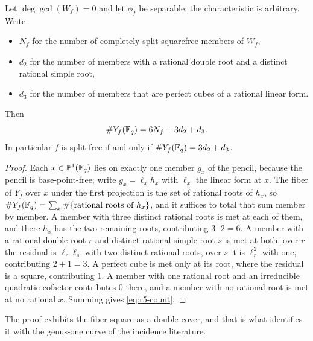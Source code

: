 \begin{proposition}\label{prop:r5-count}%
%
%
Let $\deg\gcd(W_f)=0$ and let $\phi_f$ be separable; the characteristic
is arbitrary.
Write
\begin{itemize}
\item $N_f$ for the number of completely split squarefree members of
      $W_f$,
\item $d_2$ for the number of members with a rational double root and a
      distinct rational simple root,
\item $d_3$ for the number of members that are perfect cubes of a
      rational linear form.
\end{itemize}
Then
\begin{equation}\label{eq:r5-count}
       \#Y_f(\mathbb F_q)=6N_f+3d_2+d_3 .
\end{equation}
In particular $f$ is split-free if and only if
$\#Y_f(\mathbb F_q)=3d_2+d_3$.
\end{proposition}

\begin{proof}
Each $x\in\mathbb P^1(\mathbb F_q)$ lies on exactly one member $g_x$ of the pencil,
because the pencil is base-point-free; write $g_x=\ell_xh_x$ with
$\ell_x$ the linear form at $x$.  The fiber of $Y_f$ over $x$ under the
first projection is the set of rational roots of $h_x$, so
$\#Y_f(\mathbb F_q)=\sum_x\#\{\text{rational roots of }h_x\}$, and it suffices
to total that sum member by member.  A member with three distinct
rational roots is met at each of them, and there $h_x$ has the two
remaining roots, contributing $3\cdot2=6$.  A member with a rational
double root $r$ and distinct rational simple root $s$ is met at both:
over $r$ the residual is $\ell_r\ell_s$ with two distinct rational
roots, over $s$ it is $\ell_r^2$ with one, contributing $2+1=3$.  A
perfect cube is met only at its root, where the residual is a square,
contributing $1$.  A member with one rational root and an irreducible
quadratic cofactor contributes $0$ there, and a member with no rational
root is met at no rational $x$.  Summing gives \eqref{eq:r5-count}.
\end{proof}

The proof exhibits the fiber square as a double cover, and that is what
identifies it with the genus-one curve of the incidence literature.

